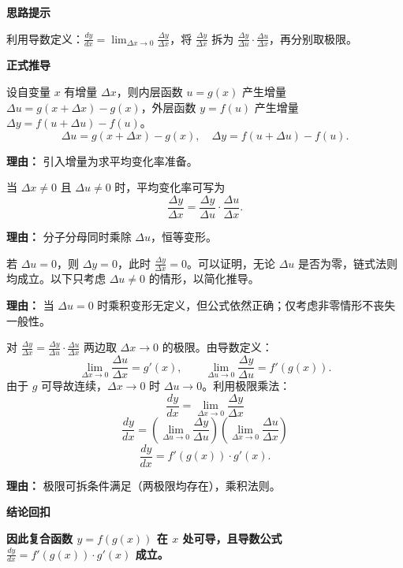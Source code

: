 \begin{proofbox}
	\textbf{\textcolor{CProof}{思路提示}}

	利用导数定义：$\frac{dy}{dx}=\lim_{\Delta x\to0}\frac{\Delta y}{\Delta x}$，将 $\frac{\Delta y}{\Delta x}$ 拆为 $\frac{\Delta y}{\Delta u}\cdot\frac{\Delta u}{\Delta x}$，再分别取极限。

	\medskip
	\textbf{\textcolor{CProof}{正式推导}}
	\begin{description}[style=nextline, leftmargin=2.8em, labelsep=0.5em, itemsep=0.55em]
		\item[\textbf{步骤一（增量定义）：}] 设自变量 $x$ 有增量 $\Delta x$，则内层函数 $u=g(x)$ 产生增量 $\Delta u=g(x+\Delta x)-g(x)$，外层函数 $y=f(u)$ 产生增量 $\Delta y=f(u+\Delta u)-f(u)$。
			\[
				\Delta u = g(x+\Delta x)-g(x),\quad \Delta y = f(u+\Delta u)-f(u).
			\]
			\par\textbf{理由：} 引入增量为求平均变化率准备。

		\item[\textbf{步骤二（乘积变形）：}] 当 $\Delta x\neq0$ 且 $\Delta u\neq0$ 时，平均变化率可写为
			\[
				\frac{\Delta y}{\Delta x} = \frac{\Delta y}{\Delta u}\cdot\frac{\Delta u}{\Delta x}.
			\]
			\par\textbf{理由：} 分子分母同时乘除 $\Delta u$，恒等变形。

		\item[\textbf{步骤三（零增量处理）：}] 若 $\Delta u=0$，则 $\Delta y=0$，此时 $\frac{\Delta y}{\Delta x}=0$。可以证明，无论 $\Delta u$ 是否为零，链式法则均成立。以下只考虑 $\Delta u\neq0$ 的情形，以简化推导。
			\par\textbf{理由：} 当 $\Delta u=0$ 时乘积变形无定义，但公式依然正确；仅考虑非零情形不丧失一般性。

		\item[\textbf{步骤四（取极限）：}] 对 $\frac{\Delta y}{\Delta x} = \frac{\Delta y}{\Delta u}\cdot\frac{\Delta u}{\Delta x}$ 两边取 $\Delta x\to0$ 的极限。由导数定义：
			\[
				\lim_{\Delta x\to0}\frac{\Delta u}{\Delta x}=g'(x),
				\qquad
				\lim_{\Delta u\to0}\frac{\Delta y}{\Delta u}=f'(g(x)).
			\]
			由于 $g$ 可导故连续，$\Delta x\to0$ 时 $\Delta u\to0$。利用极限乘法：
			\[
				\frac{dy}{dx} = \lim_{\Delta x\to0}\frac{\Delta y}{\Delta x}
			\]
			\[
				\frac{dy}{dx} = \left(\lim_{\Delta u\to0}\frac{\Delta y}{\Delta u}\right)
				\left(\lim_{\Delta x\to0}\frac{\Delta u}{\Delta x}\right)
			\]
			\[
				\frac{dy}{dx} = f'(g(x))\cdot g'(x).
			\]
			\par\textbf{理由：} 极限可拆条件满足（两极限均存在），乘积法则。

	\end{description}

	\medskip
	\textbf{\textcolor{CProof}{结论回扣}}

	\textbf{因此复合函数 $y=f(g(x))$ 在 $x$ 处可导，且导数公式 $\frac{dy}{dx}=f'(g(x))\cdot g'(x)$ 成立。}
\end{proofbox}
